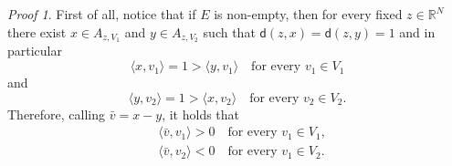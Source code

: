 \documentclass[11pt,twoside,a4paper]{article}
\newcommand{\scal}[2]{\ensuremath{\langle #1 , #2 \rangle}} %
\newcommand{\R}{\mathbb{R}}
\newcommand{\thmsymbol}{\( \square \)}
\newcommand{\di}{\mathsf d} %
\theoremstyle{theorem}
\theoremstyle{definition}
\theoremstyle{remark}
\theoremstyle{proof}
\newtheorem*{pro}{Proof}
\newenvironment{pr}{\begin{pro}%
 \renewcommand{\qedsymbol}{\thmsymbol}\pushQED{\qed}}%
 {\popQED\end{pro}}
\begin{document}
\begin{pr}
First of all, notice that if $E$ is non-empty, then for every fixed $z\in \R^N$ there exist $x\in A_{z,V_1}$ and $y\in A_{z,V_2}$ such that $\di(z,x)=\di(z,y)=1$ and in particular  
\begin{equation*}
    \scal{x}{v_1}=1 > \scal{y}{v_1} \quad \text{for every }v_1\in V_1
\end{equation*}
and
\begin{equation*}
    \scal{y}{v_2}=1 > \scal{x}{v_2} \quad \text{for every }v_2\in V_2.
\end{equation*}
Therefore, calling $\bar v =x-y$, it holds that
\begin{equation}\label{eq:barv}
    \begin{split}
        &\scal{\bar v}{v_1}>0 \quad \text{for every }v_1\in V_1,\\
        &\scal{\bar v}{v_2}<0 \quad \text{for every }v_1\in V_2.
    \end{split}
\end{equation}


\end{pr}
\end{document}
